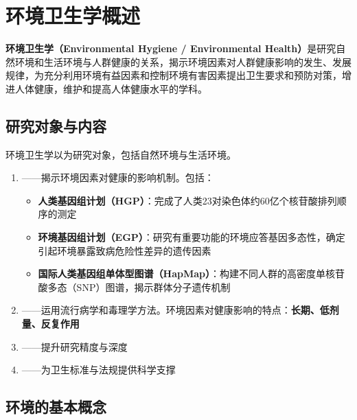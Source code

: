 \documentclass[10pt,a4paper,oneside]{ctexbook}
\begin{document}
\section{环境卫生学概述}

\begin{defbox}
\textbf{环境卫生学（Environmental Hygiene / Environmental Health）}是研究自然环境和生活环境与人群健康的关系，揭示环境因素对人群健康影响的发生、发展规律，为充分利用环境有益因素和控制环境有害因素提出卫生要求和预防对策，增进人体健康，维护和提高人体健康水平的学科。
\end{defbox}

\subsection{研究对象与内容}

环境卫生学以为研究对象，包括自然环境与生活环境。

\begin{tcolorbox}[colback=light, colframe=main, boxrule=0.5pt, arc=4pt, title=\textbf{环境卫生学的研究内容}, breakable]
\begin{enumerate}[leftmargin=*, itemsep=3pt]
    \item {}——揭示环境因素对健康的影响机制。包括：
    \begin{itemize}
        \item \textbf{人类基因组计划（HGP）}：完成了人类23对染色体约60亿个核苷酸排列顺序的测定
        \item \textbf{环境基因组计划（EGP）}：研究有重要功能的环境应答基因多态性，确定引起环境暴露致病危险性差异的遗传因素
        \item \textbf{国际人类基因组单体型图谱（HapMap）}：构建不同人群的高密度单核苷酸多态（SNP）图谱，揭示群体分子遗传机制
    \end{itemize}
    \item {}——运用流行病学和毒理学方法。环境因素对健康影响的特点：\textbf{长期、低剂量、反复作用}
    \item {}——提升研究精度与深度
    \item {}——为卫生标准与法规提供科学支撑
\end{enumerate}
\end{tcolorbox}

\subsection{环境的基本概念}
\end{document}
